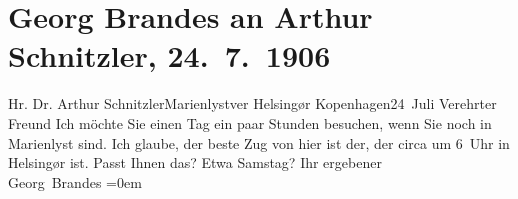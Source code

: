

         \renewcommand{\erwaehnteOrte}{Orte: Helsingør, Kopenhagen, Marienlyst}
         \renewcommand{\erwaehnteWerke}{}
               \section[Georg Brandes an Arthur Schnitzler, 24. 7. 1906]{ Georg Brandes an Arthur Schnitzler, 24. 7. 1906}\nopagebreak{}\rehead{ }\begin{ledgroupsized}[t]{13cm}\normalsize\beginnumbering \toendnotes[C]{\smallbreak\pagebreak[2]} 
\pstart{}{\pb}Hr. Dr. Arthur
                        Schnitzler\pend{}\pstart{}Marienlyst\pend{}\pstart{}ver\pend{}\pstart{} Helsingør \pend{}{\bigskip}\pstart
           \raggedleft{}{\pb}Kopenhagen24 Juli\pend
           \pstart{}Verehrter Freund\pend\pstart
           Ich möchte Sie einen Tag ein paar Stunden besuchen, wenn Sie noch in Marienlyst
               sind. Ich glaube, der beste Zug
                    von hier ist der, der circa um 6 Uhr in Helsingør ist. Passt Ihnen das? Etwa
                    Samstag?\pend
           \pstart
           Ihr ergebener{\\[\baselineskip]}\spacefill\mbox{Georg Brandes}\pend
           \leftskip=0em{}
         
         \endnumbering{}\end{ledgroupsized}  \newcommand{\dateiname}{L01615}\newcommand{\titel}{Georg Brandes an Arthur Schnitzler, 24. 7. 1906}\newcommand{\editorInnen}{Martin Anton Müller und Gerd-Hermann Susen}
      